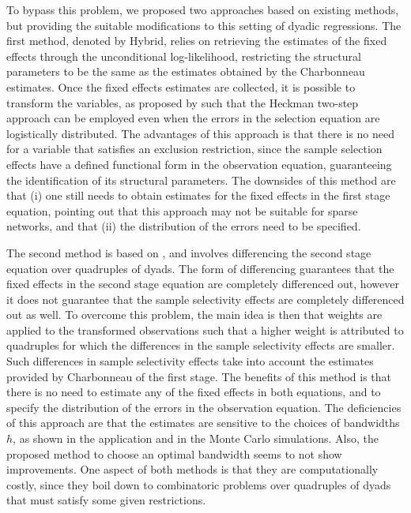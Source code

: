 To bypass this problem, we proposed two approaches based on existing methods, but providing the suitable modifications to this setting of dyadic regressions. The first method, denoted by Hybrid, relies on retrieving the estimates of the fixed effects through the unconditional log-likelihood, restricting the structural parameters to be the same as the estimates obtained by the Charbonneau estimates. Once the fixed effects estimates are collected, it is possible to transform the variables, as proposed by \cite{lee1983generalized} such that the Heckman two-step approach can be employed even when the errors in the selection equation are logistically distributed. The advantages of this approach is that there is no need for a variable that satisfies an exclusion restriction, since the sample selection effects have a defined functional form in the observation equation, guaranteeing the identification of its structural parameters. The downsides of this method are that (i) one still needs to obtain estimates for the fixed effects in the first stage equation, pointing out that this approach may not be suitable for sparse networks, and that (ii) the distribution of the errors need to be specified.

The second method is based on \cite{kyriazidou1997estimation}, and involves differencing the second stage equation over quadruples of dyads. The form of differencing guarantees that the fixed effects in the second stage equation are completely differenced out, however it does not guarantee that the sample selectivity effects are completely differenced out as well. To overcome this problem, the main idea is then that weights are applied to the transformed observations such that a higher weight is attributed to quadruples for which the differences in the sample selectivity effects are smaller. Such differences in sample selectivity effects take into account the estimates provided by Charbonneau of the first stage. The benefits of this method is that there is no need to estimate any of the fixed effects in both equations, and to specify the distribution of the errors in the observation equation. The deficiencies of this approach are that the estimates are sensitive to the choices of bandwidths $h$, as shown in the application and in the Monte Carlo simulations. Also, the proposed method to choose an optimal bandwidth seems to not show improvements. One aspect of both methods is that they are computationally costly, since they boil down to combinatoric problems over quadruples of dyads that must satisfy some given restrictions.

